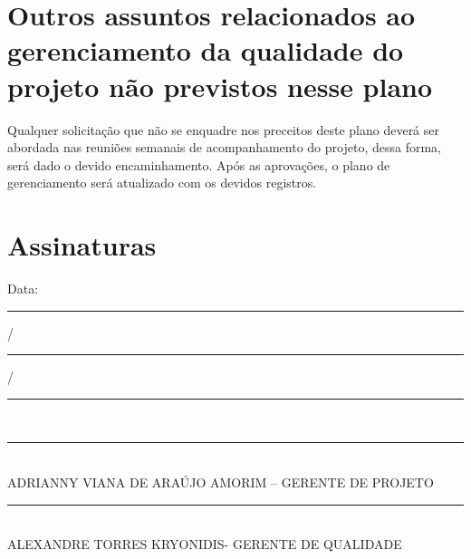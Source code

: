 \section*{Outros assuntos relacionados ao gerenciamento da qualidade do projeto não previstos nesse plano}
	Qualquer solicitação que não se enquadre nos preceitos deste plano deverá ser abordada nas reuniões semanais de acompanhamento do projeto, dessa forma, será dado o devido encaminhamento. Após as aprovações, o plano de gerenciamento será atualizado com os devidos registros.

\section*{Assinaturas}
\begin{center}
Data: \rule{0.5cm}{0.1mm}/\rule{0.5cm}{0.1mm}/\rule{1cm}{0.1mm}     \\
\rule{13cm}{0.1mm}\\
ADRIANNY VIANA DE ARAÚJO AMORIM – GERENTE DE PROJETO\\
\rule{13cm}{0.1mm}\\
ALEXANDRE TORRES KRYONIDIS- GERENTE DE QUALIDADE
\end{center}
% 